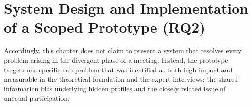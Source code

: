 \chapter{System Design and Implementation of a Scoped Prototype (RQ2)}

Accordingly, this chapter does not claim to present a system that resolves every problem arising in the
divergent phase of a meeting. Instead, the prototype targets one specific sub-problem that was identified as
both high-impact and measurable in the theoretical foundation and the expert interviews: the
shared-information bias underlying hidden profiles and the closely related issue of unequal participation.






